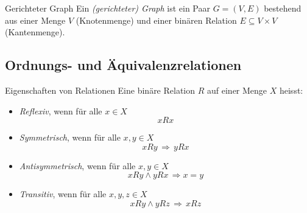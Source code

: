 \begin{comment}
    $q$&\xmark&\xmark&\cmark&\cmark&\xmark\\
    $p$&\xmark&\xmark&\cmark&\cmark&\xmark\\
    $h$&\cmark&\cmark&\xmark&\xmark&\xmark\\
    $g$&\cmark&\cmark&\xmark&\xmark&\xmark\\
    \hline
    &$g$&$h$&$p$&$q$&$r$
    \end{tabular}
    \end{center}
    Aus der Tabelle erhält man, ähnlich (gleich) wie im Fall von Funktionen und
    Funktionsgraphen, den Relationsgraph von $R_1$:
    \begin{center}
    \begin{tabular}{ c | c c c c c }
    $r$&&&&&\cellcolor{black}\\
    $q$&&&\cellcolor{black}&\cellcolor{black}&\\
    $p$&&&\cellcolor{black}&\cellcolor{black}&\\
    $h$&\cellcolor{black}&\cellcolor{black}&&&\\
    $g$&\cellcolor{black}&\cellcolor{black}&&&\\
    \hline
    &$g$&$h$&$p$&$q$&$r$
    \end{tabular}
    \end{center}
\end{example}
\end{comment}



\begin{definition}{Gerichteter Graph}
    Ein \textit{(gerichteter) Graph} ist ein Paar $G=(V,E)$ bestehend aus einer Menge $V$ (Knotenmenge)
    und einer binären Relation $E\subseteq V\times V$ (Kantenmenge).
\end{definition}






\subsection{Ordnungs- und Äquivalenzrelationen}

\begin{definition}{Eigenschaften von Relationen}
    Eine binäre Relation $R$ auf einer Menge $X$ heisst:
    \begin{itemize}
    \item \textit{Reflexiv}, wenn für alle $x\in X$
    \[
    xRx
    \]
    
    \item \textit{Symmetrisch}, wenn für alle $x,y\in X$
    \[
    xRy\,\Rightarrow\, yRx
    \]
    
    \item \textit{Antisymmetrisch}, wenn für alle $x,y\in X$
    \[
    xRy\land yRx\,\Rightarrow x=y
    \]
    
    \item \textit{Transitiv}, wenn für alle $x,y,z\in X$
    \[
    xRy\land yRz\,\Rightarrow \, xRz
    \]
    
    \end{itemize}
    \end{definition}




